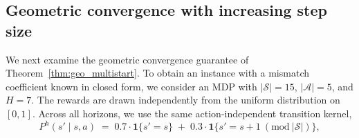 \documentclass[11pt]{article}
\begin{document}
\subsection{Geometric convergence with increasing step size} \label{subsec:increasing}
We next examine the geometric convergence guarantee of
Theorem~\ref{thm:geo_multistart}.  To obtain an instance with a mismatch
coefficient known in closed form, we consider an MDP with
$|\mathcal{S}|=15$, $|\mathcal{A}|=5$, and $H=7$.
The rewards are drawn independently from the uniform distribution on
$[0,1]$. Across all horizons, we use the same action-independent transition
kernel,
\[
P^h(s' \mid s, a)
\;=\;
0.7 \cdot \mathbf{1}\{s' = s\}
\;+\;
0.3 \cdot \mathbf{1}\{s' = s + 1 \ (\mathrm{mod}\ |\mathcal{S}|)\},
\]
\FloatBarrier
\begin{figure}[!htb]
\centering

% 
    \begin{subfigure}[t]{0.48\linewidth}
        \centering
\end{subfigure}
\end{figure}
\end{document}
